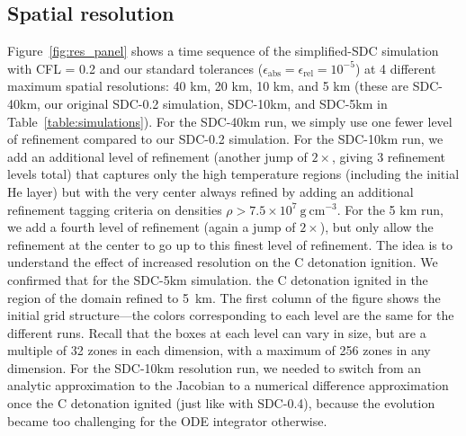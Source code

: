 \documentclass[preprint,linenumbers]{aastex631}
\newcommand{\gcc}{\mathrm{g~cm^{-3} }}
\begin{document}
\subsection{Spatial resolution}

Figure~\ref{fig:res_panel} shows a time sequence of the simplified-SDC
simulation with CFL = 0.2 and our standard tolerances
($\epsilon_\mathrm{abs} = \epsilon_\mathrm{rel} = 10^{-5}$) at 4
different maximum spatial resolutions: 40 km, 20 km, 10 km, and 5 km (these are SDC-40km, our original SDC-0.2 simulation, SDC-10km, and SDC-5km in Table~\ref{table:simulations}).  For the SDC-40km
run, we simply use one fewer level of refinement compared to our SDC-0.2
simulation.  For the SDC-10km run, we add an additional level of
refinement (another jump of $2\times$, giving 3 refinement levels total) that captures only the high temperature regions (including
the initial He layer) but with the very center always refined by
adding an additional refinement tagging criteria on densities $\rho >
7.5\times 10^7~\gcc$.  For the 5 km run, we add a fourth
level of refinement (again a jump of $2\times$), but only
allow the refinement at the center to go up to this finest level of refinement.  The idea is to understand the effect of increased resolution on the C detonation ignition.  We confirmed
that for the SDC-5km simulation. the C detonation ignited in the region of the domain refined to 5~km.
The first column of the figure shows the
initial grid structure---the colors corresponding to
each level are the same for the different runs.  Recall
that the boxes at each level can vary in size, but are a multiple of 32 zones in each
dimension, with a maximum of 256 zones in any dimension.  For the SDC-10km resolution
run, we needed to switch from an analytic approximation to the Jacobian
to a numerical difference approximation once the C detonation ignited (just like with SDC-0.4), because
the evolution became too challenging for the ODE integrator otherwise.

\begin{figure*}[t]
\centering
{}
\caption{\label{fig:res_panel} Temperature evolution for SDC simulations with CFL=0.2 at 40, 20, and 10 km.  For the earliest time
  in each resolution, the AMR grid structure is shown.}
\end{figure*}


\end{document}
